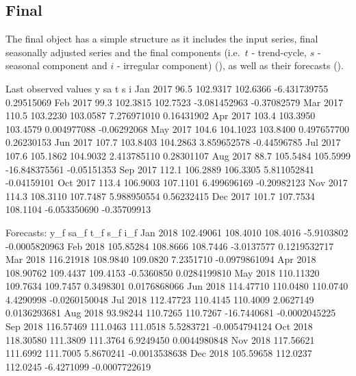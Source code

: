 \documentclass[article]{jss}
\begin{document}
\hypertarget{final}{%
\subsection{Final}\label{final}}

The final object has a simple structure as it includes the input series,
final seasonally adjusted series and the final components (i.e.~\(t\) -
trend-cycle, \(s\) - seasonal component and \(i\) - irregular component)
(), as well as their forecasts ().

\begin{CodeChunk}


\begin{CodeOutput}
Last observed values
             y       sa        t             s           i
Jan 2017  96.5 102.9317 102.6366  -6.431739755  0.29515069
Feb 2017  99.3 102.3815 102.7523  -3.081452963 -0.37082579
Mar 2017 110.5 103.2230 103.0587   7.276971010  0.16431902
Apr 2017 103.4 103.3950 103.4579   0.004977088 -0.06292068
May 2017 104.6 104.1023 103.8400   0.497657700  0.26230153
Jun 2017 107.7 103.8403 104.2863   3.859652578 -0.44596785
Jul 2017 107.6 105.1862 104.9032   2.413785110  0.28301107
Aug 2017  88.7 105.5484 105.5999 -16.848375561 -0.05151353
Sep 2017 112.1 106.2889 106.3305   5.811052841 -0.04159101
Oct 2017 113.4 106.9003 107.1101   6.499696169 -0.20982123
Nov 2017 114.3 108.3110 107.7487   5.988950554  0.56232415
Dec 2017 101.7 107.7534 108.1104  -6.053350690 -0.35709913

Forecasts:
               y_f     sa_f      t_f         s_f           i_f
Jan 2018 102.49061 108.4010 108.4016  -5.9103802 -0.0005820963
Feb 2018 105.85284 108.8666 108.7446  -3.0137577  0.1219532717
Mar 2018 116.21918 108.9840 109.0820   7.2351710 -0.0979861094
Apr 2018 108.90762 109.4437 109.4153  -0.5360850  0.0284199810
May 2018 110.11320 109.7634 109.7457   0.3498301  0.0176868066
Jun 2018 114.47710 110.0480 110.0740   4.4290998 -0.0260150048
Jul 2018 112.47723 110.4145 110.4009   2.0627149  0.0136293681
Aug 2018  93.98244 110.7265 110.7267 -16.7440681 -0.0002045225
Sep 2018 116.57469 111.0463 111.0518   5.5283721 -0.0054794124
Oct 2018 118.30580 111.3809 111.3764   6.9249450  0.0044980848
Nov 2018 117.56621 111.6992 111.7005   5.8670241 -0.0013538638
Dec 2018 105.59658 112.0237 112.0245  -6.4271099 -0.0007722619
\end{CodeOutput}
\end{CodeChunk}
\end{document}
